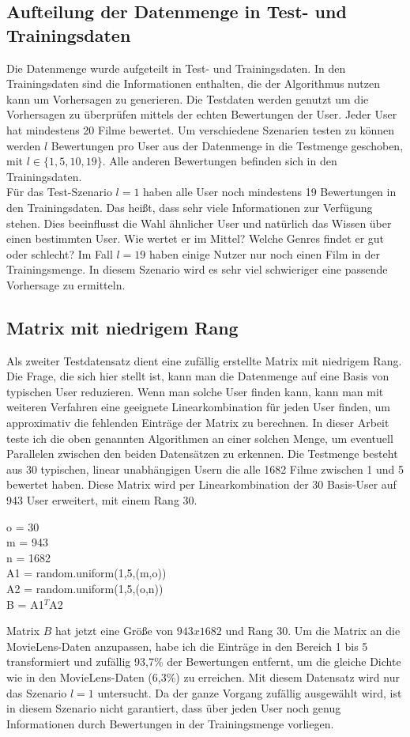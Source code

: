 \subsection{Aufteilung der Datenmenge in Test- und Trainingsdaten}\label{s.split}
Die Datenmenge wurde aufgeteilt in Test- und Trainingsdaten. In den Trainingsdaten sind die Informationen enthalten, die der Algorithmus nutzen kann um Vorhersagen zu generieren. Die Testdaten werden genutzt um die Vorhersagen zu überprüfen mittels der echten Bewertungen der User. Jeder User hat mindestens 20 Filme bewertet. Um verschiedene Szenarien testen zu können werden $l$ Bewertungen pro User aus der Datenmenge in die Testmenge geschoben, mit $l \in \{1,5,10,19\}$. Alle anderen Bewertungen befinden sich in den Trainingsdaten.\\
Für das Test-Szenario $l = 1$ haben alle User noch mindestens 19 Bewertungen in den Trainingsdaten. Das heißt, dass sehr viele Informationen zur Verfügung stehen. Dies beeinflusst die Wahl ähnlicher User und natürlich das Wissen über einen bestimmten User. Wie wertet er im Mittel? Welche Genres findet er gut oder schlecht? Im Fall $l = 19$ haben einige Nutzer nur noch einen Film in der Trainingsmenge. In diesem Szenario wird es sehr viel schwieriger eine passende Vorhersage zu ermitteln.
	
\subsection{Matrix mit niedrigem Rang}
Als zweiter Testdatensatz dient eine zufällig erstellte Matrix mit niedrigem Rang. Die Frage, die sich hier stellt ist, kann man die Datenmenge auf eine Basis von typischen User reduzieren. Wenn man solche User finden kann, kann man mit weiteren Verfahren eine geeignete Linearkombination für jeden User finden, um approximativ die fehlenden Einträge der Matrix zu berechnen. In dieser Arbeit teste ich die oben genannten Algorithmen an einer solchen Menge, um eventuell Parallelen zwischen den beiden Datensätzen zu erkennen. Die Testmenge besteht aus 30 typischen, linear unabhängigen Usern die alle 1682 Filme zwischen 1 und 5 bewertet haben. Diese Matrix wird per Linearkombination der 30 Basis-User auf 943 User erweitert, mit einem Rang 30.
\begin{algorithm}[H]
o = 30 \\
m = 943 \\
n = 1682 \\
A1 = random.uniform(1,5,(m,o))\\
A2 = random.uniform(1,5,(o,n))\\
B = A1$^{T}$A2
\end{algorithm}
Matrix $B$ hat jetzt eine Größe von $943x1682$ und Rang 30. Um die Matrix an die MovieLens-Daten anzupassen, habe ich die Einträge in den Bereich 1 bis 5 transformiert und zufällig 93,7\% der Bewertungen entfernt, um die gleiche Dichte wie in den MovieLens-Daten (6,3\%) zu erreichen. Mit diesem Datensatz wird nur das Szenario $l = 1$ untersucht. Da der ganze Vorgang zufällig ausgewählt wird, ist in diesem Szenario nicht garantiert, dass über jeden User noch genug Informationen durch Bewertungen in der Trainingsmenge vorliegen.

